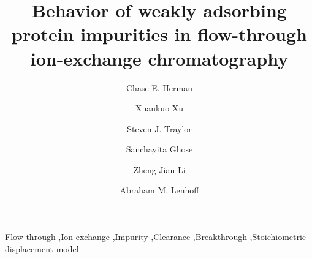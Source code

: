 \documentclass[preprint,review,12pt]{elsarticle}
\begin{document}
\begin{frontmatter}
    \title{Behavior of weakly adsorbing protein impurities in flow-through ion-exchange chromatography}
    \author[inst1]{Chase E. Herman}
    \author[inst2]{Xuankuo Xu}
    \author[inst2]{Steven J. Traylor}
    \author[inst2]{Sanchayita Ghose}
    \author[inst2]{Zheng Jian Li}
    \author[inst1]{Abraham M. Lenhoff }






    \begin{keyword}
    Flow-through \sep Ion-exchange \sep Impurity \sep Clearance \sep Breakthrough \sep Stoichiometric displacement model
    \end{keyword}


    \begin{abstract}


\end{abstract}
\end{frontmatter}
\end{document}
